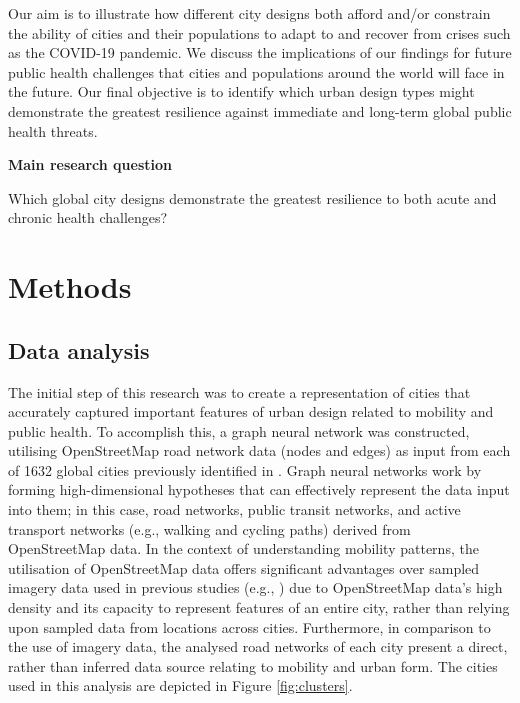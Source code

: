 \documentclass[preprint,12pt]{elsarticle}
\begin{document}
Our aim is to illustrate how different city designs both afford and/or constrain the ability of cities and their populations to adapt to and recover from crises such as the COVID-19 pandemic. We discuss the implications of our findings for future public health challenges that cities and populations around the world will face in the future. Our final objective is to identify which urban design types might demonstrate the greatest resilience against immediate and long-term global public health threats. 


\textbf{Main research question}

 Which global city designs demonstrate the greatest resilience to both acute and chronic health challenges?








\section*{Methods}



\subsection*{Data analysis}
The initial step of this research was to create a representation of cities that accurately captured important features of urban design related to mobility and public health. To accomplish this, a graph neural network was constructed, utilising OpenStreetMap road network data (nodes and edges) as input from each of 1632 global cities previously identified in \cite{Thompson2020}. Graph neural networks work by forming high-dimensional hypotheses that can effectively represent the data input into them; in this case, road networks, public transit networks, and active transport networks (e.g., walking and cycling paths) derived from OpenStreetMap data\cite{Boeing2017a}. In the context of understanding mobility patterns, the utilisation of OpenStreetMap data offers significant advantages over sampled imagery data used in previous studies (e.g., \cite{Thompson2020,seneviratne2021self}) due to OpenStreetMap data's high density and its capacity to represent features of an entire city, rather than relying upon sampled data from locations across cities. Furthermore, in comparison to the use of imagery data, the analysed road networks of each city present a direct, rather than inferred data source relating to mobility and urban form. The cities used in this analysis are depicted in Figure \ref{fig:clusters}.
\end{document}
